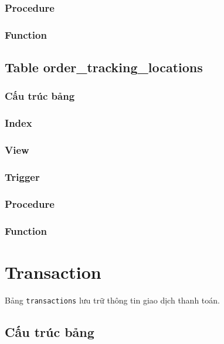 \subsubsection{Procedure}

\subsubsection{Function}

\subsection{Table order\_tracking\_locations}

\subsubsection{Cấu trúc bảng}

\subsubsection{Index}

\subsubsection{View}

\subsubsection{Trigger}

\subsubsection{Procedure}

\subsubsection{Function}

\section{Transaction}

Bảng \texttt{transactions} lưu trữ thông tin giao dịch thanh toán.

\subsection{Cấu trúc bảng}


